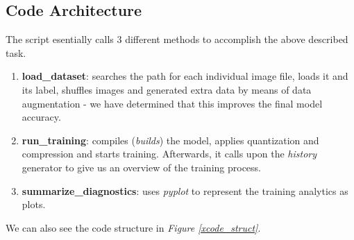 \subsection{Code Architecture}
The script esentially calls 3 different methods to accomplish the above described task. 
\begin{enumerate}
    \item \textbf{load\_dataset}: searches the path for each individual image file, loads it and its label, shuffles images and generated extra data by means of data augmentation - we have determined that this improves the final model accuracy. 
    \item \textbf{run\_training}: compiles (\textit{builds}) the model, applies quantization and compression and starts training. Afterwards, it calls upon the \textit{history} generator to give us an overview of the training process.
    \item \textbf{summarize\_diagnostics}: uses \textit{pyplot} to represent the training analytics as plots.
\end{enumerate}
We can also see the code structure in \textit{Figure \ref{xcode_struct}}.

